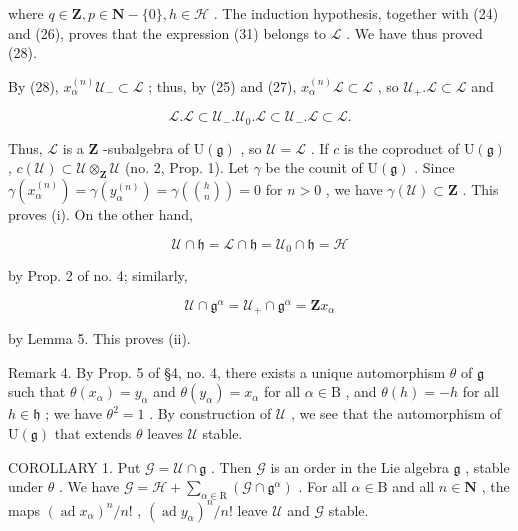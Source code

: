 where \(q \in \mathbf{Z}, p \in \mathbf{N} - \{0\}, h \in \mathcal{H}\) . The induction hypothesis, together with (24) and (26), proves that the expression (31) belongs to \(\mathcal{L}\) . We have thus proved (28).

By (28), \(x_{\alpha}^{(n)}\mathcal{U}_{-}\subset \mathcal{L}\) ; thus, by (25) and (27), \(x_{\alpha}^{(n)}\mathcal{L}\subset \mathcal{L}\) , so \(\mathcal{U}_{+}.\mathcal{L}\subset \mathcal{L}\) and

\[
\mathcal {L}. \mathcal {L} \subset \mathcal {U} _ {-}. \mathcal {U} _ {0}. \mathcal {L} \subset \mathcal {U} _ {-}. \mathcal {L} \subset \mathcal {L}.
\]

Thus, \(\mathcal{L}\) is a \(\mathbf{Z}\) -subalgebra of \(\mathrm{U}(\mathfrak{g})\) , so \(\mathcal{U} = \mathcal{L}\) . If \(c\) is the coproduct of \(\mathrm{U}(\mathfrak{g})\) , \(c(\mathcal{U}) \subset \mathcal{U} \otimes_{\mathbf{Z}} \mathcal{U}\) (no. 2, Prop. 1). Let \(\gamma\) be the counit of \(\mathrm{U}(\mathfrak{g})\) . Since \(\gamma(x_{\alpha}^{(n)}) = \gamma(y_{\alpha}^{(n)}) = \gamma\left(\binom{h}{n}\right) = 0\) for \(n > 0\) , we have \(\gamma(\mathcal{U}) \subset \mathbf{Z}\) . This proves (i). On the other hand,

\[
\mathcal {U} \cap \mathfrak {h} = \mathcal {L} \cap \mathfrak {h} = \mathcal {U} _ {0} \cap \mathfrak {h} = \mathcal {H}
\]

by Prop. 2 of no. 4; similarly,

\[
\mathcal {U} \cap \mathfrak {g} ^ {\alpha} = \mathcal {U} _ {+} \cap \mathfrak {g} ^ {\alpha} = \mathbf {Z} x _ {\alpha}
\]

by Lemma 5. This proves (ii).

Remark 4. By Prop. 5 of §4, no. 4, there exists a unique automorphism \(\theta\) of \(\mathfrak{g}\) such that \(\theta(x_{\alpha}) = y_{\alpha}\) and \(\theta(y_{\alpha}) = x_{\alpha}\) for all \(\alpha \in \mathrm{B}\) , and \(\theta(h) = -h\) for all \(h \in \mathfrak{h}\) ; we have \(\theta^2 = 1\) . By construction of \(\mathcal{U}\) , we see that the automorphism of \(\mathrm{U}(\mathfrak{g})\) that extends \(\theta\) leaves \(\mathcal{U}\) stable.

COROLLARY 1. Put \(\mathcal{G} = \mathcal{U} \cap \mathfrak{g}\) . Then \(\mathcal{G}\) is an order in the Lie algebra \(\mathfrak{g}\) , stable under \(\theta\) . We have \(\mathcal{G} = \mathcal{H} + \sum_{\alpha \in \mathrm{R}} (\mathcal{G} \cap \mathfrak{g}^{\alpha})\) . For all \(\alpha \in \mathrm{B}\) and all \(n \in \mathbf{N}\) , the maps \((\operatorname{ad} x_{\alpha})^{n} / n!\) , \((\operatorname{ad} y_{\alpha})^{n} / n!\) leave \(\mathcal{U}\) and \(\mathcal{G}\) stable.

